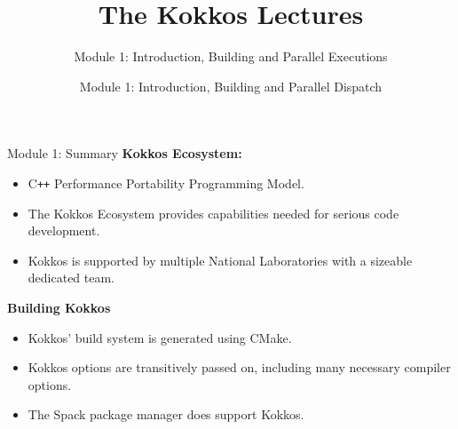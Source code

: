 
\def\sandid{SAND2020-7263 PE}

\title{The Kokkos Lectures}
\subtitle{Module 1: Introduction, Building and Parallel Executions}

\author{Module 1: Introduction, Building and Parallel Dispatch}



\shortfalse
\mediumtrue
\fulltrue
\notoverviewtrue



% 

\begin{frame}
	\titlepage
\end{frame}













\begin{frame}{Module 1: Summary}
	\textbf{Kokkos Ecosystem:}
	\begin{itemize}
		\item C\texttt{++} Performance Portability Programming Model.
		\item The Kokkos Ecosystem provides capabilities needed for serious code development.
		\item Kokkos is supported by multiple National Laboratories with a sizeable dedicated team.
	\end{itemize}

	\textbf{Building Kokkos}
	\begin{itemize}
    \item{Kokkos' build system is generated using CMake.}
    \item{Kokkos options are transitively passed on, including many necessary compiler options.}
    \item{The Spack package manager does support Kokkos.}
	\end{itemize}
\end{frame}


